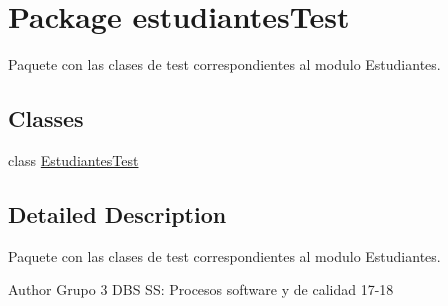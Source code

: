 \hypertarget{namespaceestudiantes_test}{}\section{Package estudiantes\+Test}
\label{namespaceestudiantes_test}


Paquete con las clases de test correspondientes al modulo Estudiantes.  


\subsection*{Classes}
\begin{DoxyCompactItemize}
\item 
class \hyperlink{classestudiantes_test_1_1_estudiantes_test}{Estudiantes\+Test}
\end{DoxyCompactItemize}


\subsection{Detailed Description}
Paquete con las clases de test correspondientes al modulo Estudiantes. 

\begin{DoxyAuthor}{Author}
Grupo 3 D\+BS SS\+: Procesos software y de calidad 17-\/18 
\end{DoxyAuthor}
